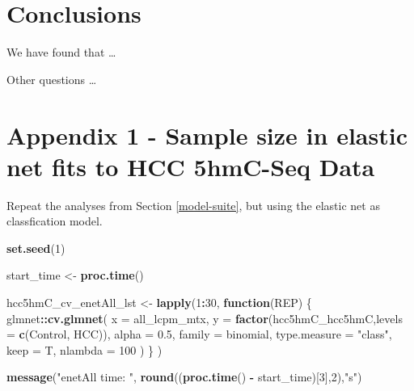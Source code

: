 \documentclass[
]{book}
\newenvironment{Shaded}{\begin{snugshade}}{\end{snugshade}}
\newcommand{\ControlFlowTok}[1]{\textcolor[rgb]{0.13,0.29,0.53}{\textbf{#1}}}
\newcommand{\DataTypeTok}[1]{\textcolor[rgb]{0.13,0.29,0.53}{#1}}
\newcommand{\DecValTok}[1]{\textcolor[rgb]{0.00,0.00,0.81}{#1}}
\newcommand{\FloatTok}[1]{\textcolor[rgb]{0.00,0.00,0.81}{#1}}
\newcommand{\KeywordTok}[1]{\textcolor[rgb]{0.13,0.29,0.53}{\textbf{#1}}}
\newcommand{\NormalTok}[1]{#1}
\newcommand{\OperatorTok}[1]{\textcolor[rgb]{0.81,0.36,0.00}{\textbf{#1}}}
\newcommand{\StringTok}[1]{\textcolor[rgb]{0.31,0.60,0.02}{#1}}
\begin{document}
\hypertarget{conclusions}{%
\chapter{Conclusions}\label{conclusions}}

We have found that \ldots{}

Other questions \ldots{}

\hypertarget{appendix-1}{%
\chapter*{Appendix 1 - Sample size in elastic net fits to HCC 5hmC-Seq Data}\label{appendix-1}}

Repeat the analyses from Section \ref{model-suite}, but using
the elastic net as classfication model.

\begin{Shaded}
\begin{Highlighting}[]
\KeywordTok{set.seed}\NormalTok{(}\DecValTok{1}\NormalTok{)}

\NormalTok{start\_time <{-}}\StringTok{  }\KeywordTok{proc.time}\NormalTok{()}

\NormalTok{hcc5hmC\_cv\_enetAll\_lst <{-}}\StringTok{ }\KeywordTok{lapply}\NormalTok{(}\DecValTok{1}\OperatorTok{:}\DecValTok{30}\NormalTok{, }\ControlFlowTok{function}\NormalTok{(REP) \{}
\NormalTok{glmnet}\OperatorTok{::}\KeywordTok{cv.glmnet}\NormalTok{(}
 \DataTypeTok{x =}\NormalTok{ all\_lcpm\_mtx,}
 \DataTypeTok{y =} \KeywordTok{factor}\NormalTok{(hcc5hmC\_hcc5hmC,}\DataTypeTok{levels =} \KeywordTok{c}\NormalTok{(}\StringTok{\textquotesingle{}Control\textquotesingle{}}\NormalTok{, }\StringTok{\textquotesingle{}HCC\textquotesingle{}}\NormalTok{)),}
 \DataTypeTok{alpha =} \FloatTok{0.5}\NormalTok{,}
 \DataTypeTok{family =} \StringTok{\textquotesingle{}binomial\textquotesingle{}}\NormalTok{,}
 \DataTypeTok{type.measure  =}  \StringTok{"class"}\NormalTok{,}
 \DataTypeTok{keep =}\NormalTok{ T,}
 \DataTypeTok{nlambda =} \DecValTok{100}
\NormalTok{)}
\NormalTok{\}}
\NormalTok{)}

\KeywordTok{message}\NormalTok{(}\StringTok{"enetAll time: "}\NormalTok{, }\KeywordTok{round}\NormalTok{((}\KeywordTok{proc.time}\NormalTok{() }\OperatorTok{{-}}\StringTok{ }\NormalTok{start\_time)[}\DecValTok{3}\NormalTok{],}\DecValTok{2}\NormalTok{),}\StringTok{"s"}\NormalTok{)}
\end{Highlighting}
\end{Shaded}
\end{document}
